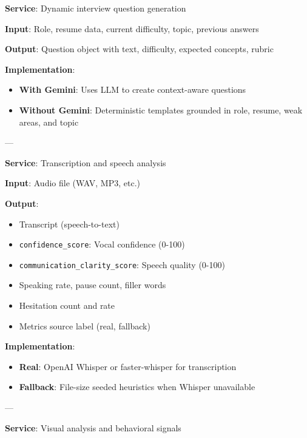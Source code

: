 \documentclass[11pt]{article}
\begin{document}
\begin{description}[leftmargin=3cm, style=nextline]

  \item[\textbf{question\_generator}]
  \textbf{Service}: Dynamic interview question generation

  \textbf{Input}: Role, resume data, current difficulty, topic, previous answers

  \textbf{Output}: Question object with text, difficulty, expected concepts, rubric

  \textbf{Implementation}:
  \begin{itemize}
    \item \textbf{With Gemini}: Uses LLM to create context-aware questions
    \item \textbf{Without Gemini}: Deterministic templates grounded in role, resume, weak areas, and topic
  \end{itemize}

  ---

  \item[\textbf{audio\_analyzer}]
  \textbf{Service}: Transcription and speech analysis

  \textbf{Input}: Audio file (WAV, MP3, etc.)

  \textbf{Output}:
  \begin{itemize}
    \item Transcript (speech-to-text)
    \item \texttt{confidence\_score}: Vocal confidence (0-100)
    \item \texttt{communication\_clarity\_score}: Speech quality (0-100)
    \item Speaking rate, pause count, filler words
    \item Hesitation count and rate
    \item Metrics source label (real, fallback)
  \end{itemize}

  \textbf{Implementation}:
  \begin{itemize}
    \item \textbf{Real}: OpenAI Whisper or faster-whisper for transcription
    \item \textbf{Fallback}: File-size seeded heuristics when Whisper unavailable
  \end{itemize}

  ---

  \item[\textbf{video\_analyzer}]
  \textbf{Service}: Visual analysis and behavioral signals


\end{description}
\end{document}
